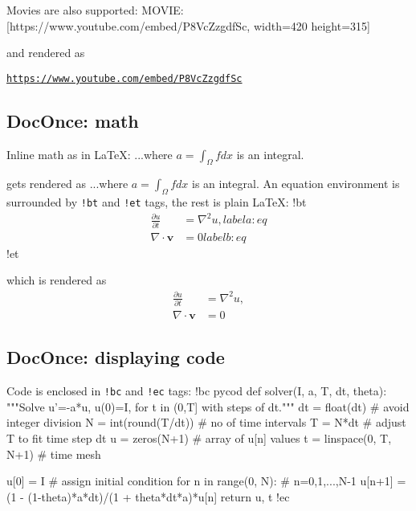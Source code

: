 \documentclass[%
oneside,                 %
final,                   %
10pt]{article}
\newenvironment{doconce:movie}{}{}
\newcounter{doconce:movie:counter}
\begin{document}
Movies are also supported:
\bccq
MOVIE: [https://www.youtube.com/embed/P8VcZzgdfSc, width=420 height=315]

\eccq

and rendered as
\begin{doconce:movie}
\begin{center}
\href{{https://www.youtube.com/embed/P8VcZzgdfSc}}{\nolinkurl{https://www.youtube.com/embed/P8VcZzgdfSc}}
\end{center}
\end{doconce:movie}
\subsection{DocOnce: math}
Inline math as in {\LaTeX}:
\bccq
...where $a=\int_{\Omega}fdx$ is an integral.

\eccq

gets rendered as ...where $a=\int_{\Omega}fdx$ is an integral.
An equation environment is surrounded by \Verb?!bt? and \Verb?!et? tags,
the rest is plain {\LaTeX}:
\bccq
!bt
\begin{align}
\frac{\partial u}{\partial t} &= \nabla^2 u,
label{a:eq}\\
\nabla\cdot\pmb{v} & = 0
label{b:eq}
\end{align}
!et

\eccq

which is rendered as
\begin{align}
\frac{\partial u}{\partial t} &= \nabla^2 u,
\label{_a:eq}\\
\nabla\cdot\pmb{v} & = 0
\label{_b:eq}
\end{align}
\subsection{DocOnce: displaying code}
Code is enclosed in \Verb?!bc? and \Verb?!ec? tags:
\bccq
!bc pycod
def solver(I, a, T, dt, theta):
    """Solve u'=-a*u, u(0)=I, for t in (0,T] with steps of dt."""
    dt = float(dt)           # avoid integer division
    N = int(round(T/dt))     # no of time intervals
    T = N*dt                 # adjust T to fit time step dt
    u = zeros(N+1)           # array of u[n] values
    t = linspace(0, T, N+1)  # time mesh

    u[0] = I                 # assign initial condition
    for n in range(0, N):    # n=0,1,...,N-1
        u[n+1] = (1 - (1-theta)*a*dt)/(1 + theta*dt*a)*u[n]
    return u, t
!ec
\end{document}
